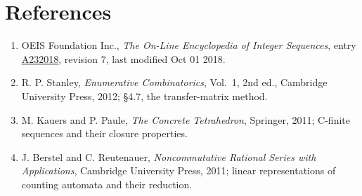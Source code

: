 \documentclass[11pt]{article}
\theoremstyle{definition}
\begin{document}
\section{References}

\begin{enumerate}

\item OEIS Foundation Inc., \emph{The On-Line Encyclopedia of Integer Sequences}, entry \href{https://oeis.org/A232018}{A232018}, revision 7, last modified Oct 01 2018.

\item R. P. Stanley, \emph{Enumerative Combinatorics}, Vol.~1, 2nd ed., Cambridge University Press, 2012; \S4.7, the transfer-matrix method.

\item M. Kauers and P. Paule, \emph{The Concrete Tetrahedron}, Springer, 2011; C-finite sequences and their closure properties.

\item J. Berstel and C. Reutenauer, \emph{Noncommutative Rational Series with Applications}, Cambridge University Press, 2011; linear representations of counting automata and their reduction.

\end{enumerate}
\end{document}
